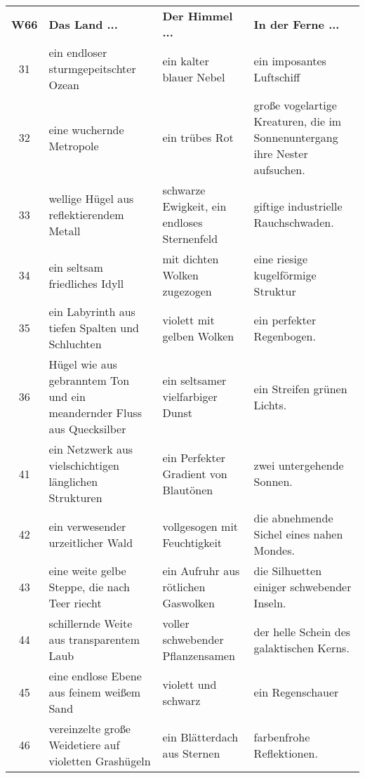 \begin{tabularx}{\columnwidth}{cZZZ}
\textbf{W66} & \textbf{Das Land ...} & \textbf{Der Himmel ...} &
\textbf{In der Ferne ...} \\
31 & ein endloser sturmgepeitschter Ozean & ein kalter blauer Nebel
& ein imposantes Luftschiff \\
32 & eine wuchernde Metropole & ein trübes Rot & große vogelartige
Kreaturen, die im Sonnenuntergang ihre Nester aufsuchen. \\
33 & wellige Hügel aus reflektierendem Metall &
schwarze Ewigkeit, ein endloses Sternenfeld & giftige
industrielle Rauchschwaden. \\
34 & ein seltsam friedliches Idyll & mit dichten Wolken zugezogen &
eine riesige kugelförmige Struktur \\
35 & ein Labyrinth aus tiefen Spalten und Schluchten & violett mit
gelben Wolken & ein perfekter Regenbogen. \\
36 & Hügel wie aus gebranntem Ton und ein meandernder Fluss aus
Quecksilber & ein seltsamer vielfarbiger Dunst & ein Streifen grünen
Lichts. \\
41 & ein Netzwerk aus vielschichtigen länglichen Strukturen  & ein
Perfekter Gradient von Blautönen & zwei untergehende Sonnen. \\
42 & ein verwesender urzeitlicher Wald & vollgesogen mit
Feuchtigkeit & die abnehmende Sichel eines nahen Mondes. \\
43 & eine weite gelbe Steppe, die nach Teer riecht & ein Aufruhr aus
rötlichen Gaswolken & die Silhuetten einiger schwebender Inseln. \\
44 & schillernde Weite aus transparentem Laub & voller schwebender
Pflanzensamen & der helle Schein des galaktischen Kerns. \\
45 & eine endlose Ebene aus feinem weißem Sand & violett und schwarz
& ein Regenschauer \\
46 & vereinzelte große Weidetiere auf violetten Grashügeln & ein
Blätterdach aus Sternen & farbenfrohe Reflektionen. \\
\end{tabularx}

